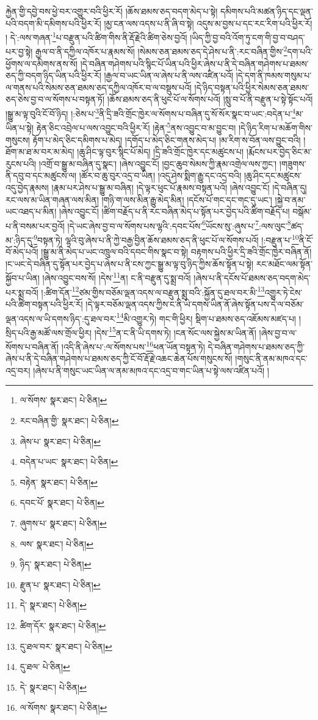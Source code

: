 རྐྱེན་གྱི་དབྱེ་བས་ཕྱེ་བར་འགྱུར་བའི་ཕྱིར་རོ། །ཆོས་ཐམས་ཅད་བདག་མེད་པ་སྟེ། དམིགས་པའི་མཚན་ཉིད་དང་ལྡན་པའི་བདག་མི་དམིགས་པའི་ཕྱིར་རོ། །མྱ་ངན་ལས་འདས་པ་ནི་ཞི་བ་སྟེ། འདུས་མ་བྱས་པ་དང་རང་རིག་པའི་ཕྱིར་རོ། །
དེ་:ལས་གཞན་\footnote{ལ་སོགས་  སྣར་ཐང་།  པེ་ཅིན། }པ་བརྫུན་པའི་ཚིག་གིས་ནི་རྡོ་རྗེའི་ཚིག་ཅེས་བྱའོ། །ཡིད་ཀྱི་བྱ་བའི་འོག་ཏུ་ངག་གི་བྱ་བ་བཤད་པར་བྱ་སྟེ། རྒྱལ་བ་ནི་དཀྱིལ་འཁོར་པ་རྣམས་སོ། །སེམས་ཅན་ཐམས་ཅད་དེ་ཤེས་པ་ནི་:རང་བཞིན་གྱིས་\footnote{རང་བཞིན་གྱི་  སྣར་ཐང་།  པེ་ཅིན། }དག་པའི་ཕྱོགས་ལ་དམིགས་ནས་སོ། །དེ་བཞིན་གཤེགས་པའི་སྙིང་པོ་ཡིན་པའི་ཕྱིར་ཞེས་པ་ནི་དེ་བཞིན་གཤེགས་པ་ཐམས་ཅད་ཀྱི་བདག་ཉིད་ཡིན་པའི་ཕྱིར་རོ། །རྒྱལ་བ་ཡང་ཡིན་ལ་ཞེས་པ་ནི་ལས་འཛིན་པའོ། །དེ་དག་ནི་ཁམས་གསུམ་པ་ལ་གནས་པའི་སེམས་ཅན་ཐམས་ཅད་དཀྱིལ་འཁོར་བ་ལ་བསྡུས་པའོ། །དེ་ཉིད་བསྟན་པའི་ཕྱིར་སེམས་ཅན་ཐམས་ཅད་ཅེས་བྱ་བ་ལ་སོགས་པ་བསྟན་ཏོ། །ཆོས་ཐམས་ཅད་ནི་ཕུང་པོ་ལ་སོགས་པའོ། །སླུ་བ་པོ་ནི་བརྫུན་པ་སྟེ་སྟོང་པའོ། །སྒྱུ་མ་ལྟ་བུའི་ངོ་བོ་ཉིད། །:ཅེས་པ་\footnote{ཞེས་པ་  སྣར་ཐང་།  པེ་ཅིན། }ནི་དྲི་ཟའི་གྲོང་ཁྱེར་ལ་སོགས་པ་བཞིན་དུ་སོ་སོར་སྣང་བ་ཡང་:བདེན་པ་\footnote{བདེན་པ་ཡང་  སྣར་ཐང་།  པེ་ཅིན། }མ་ཡིན་པ་སྟེ། རྟེན་ཅིང་འབྲེལ་པ་ལས་འབྱུང་བའི་ཕྱིར་རོ། །རྟེན་\footnote{བརྟེན་  སྣར་ཐང་།  པེ་ཅིན། }ནས་འབྱུང་བ་མ་བྱུང་བ། །དེ་ཉིད་རིག་པ་མཆོག་གིས་གསུངས། རྟོག་པ་མེད་ཅིང་དམིགས་པ་མེད། །དགོད་པ་མེད་ཅིང་གནས་མེད་པ། །མ་རིག་ས་བོན་ལས་བྱུང་བའི། །ཐོག་མ་ཐ་མ་བར་མ་མེད། །ཆུ་ཤིང་ལྟ་བུར་སྙིང་པོ་མེད། །དྲི་ཟའི་གྲོང་ཁྱེར་དང་མཚུངས་པ། །རྨོངས་པར་བྱེད་ཅིང་མ་རུངས་པའི། །འགྲོ་བ་སྒྱུ་མ་བཞིན་དུ་སྣང་། །ཞེས་འབྱུང་ངོ། །བྱང་ཆུབ་སེམས་ཀྱི་རྣམ་འགྲེལ་ལས་ཀྱང་། །གཟུགས་ནི་དབུ་བ་དང་མཚུངས་ལ། །ཚོར་བ་ཆུ་བུར་འདྲ་བ་ཡིན། །འདུ་ཤེས་སྨིག་རྒྱུ་དང་འདྲ་བའི། །ཆུ་ཤིང་དང་མཚུངས་འདུ་བྱེད་རྣམས། །རྣམ་པར་ཤེས་པ་སྒྱུ་མ་བཞིན། །དེ་ལྟར་ཕུང་པོ་རྣམས་བསྟན་པའོ། །ཞེས་འབྱུང་ངོ། །དེ་བཞིན་དུ། རང་ལས་མ་ཡིན་གཞན་ལས་མིན། །གཉི་ག་ལས་མིན་རྒྱུ་མེད་མིན། །དངོས་པོ་གང་དང་གང་དུ་ཡང་། །སྐྱེ་བ་ནམ་ཡང་འཐད་པ་མིན། །ཞེས་འབྱུང་ངོ། །ཚིག་བརྗོད་པ་ནི་རང་བཞིན་མེད་པ་སྟོན་པར་བྱེད་པའི་ཚིག་བརྗོད་པ། བསྒོམ་པ་ནི་བསམ་པར་བྱའོ། །དེ་ཡང་ཞེས་བྱ་བ་ལ་སོགས་པས་ལྷའི་:དབང་པོས་\footnote{དབང་པོ་  སྣར་ཐང་།  པེ་ཅིན། }ཡོངས་སུ་:ཞུས་པ་\footnote{ཞུགས་པ་  སྣར་ཐང་།  པེ་ཅིན། }:ལས་ལུང་\footnote{ལས་  སྣར་ཐང་།  པེ་ཅིན། }ཚད་མ་:ཉིད་དུ་\footnote{ཉིད་  སྣར་ཐང་།  པེ་ཅིན། }བསྟན་ཏེ། ལྷའི་བུ་ཞེས་པ་ནི་ཀྱེ་བརྒྱ་བྱིན་ཆོས་ཐམས་ཅད་ནི་ཕུང་པོ་ལ་སོགས་པའོ། །:བརྫུན་པ་\footnote{རྫུན་པ་  སྣར་ཐང་།  པེ་ཅིན། }ནི་ངོ་བོ་མེད་པའོ། །སྒྱུ་མ་ནི་མེད་པ་ཡང་འཁྲུལ་བའི་དབང་གིས་སྣང་བ་སྟེ། བརྟགས་པའི་ཕྱིར་དྲི་ཟའི་གྲོང་ཁྱེར་བཞིན་ནོ། །ང་ཡང་དེ་བཞིན་དུ་སྟོན་པར་བྱེད་པ་ཞེས་པ་ནི་ངས་ཀྱང་སྒྱུ་མ་ལྟ་བུ་ཉིད་ཀྱིས་ཆོས་སྟོན་པ་སྟེ། རང་མཐོང་ལམ་སྟོན་སྐྱོབ་པ་ཡིན། །ཞེས་འབྱུང་བས་སོ། །དེས་\footnote{དེ་  སྣར་ཐང་།  པེ་ཅིན། }ན། ང་ནི་བརྫུན་དུ་སྨྲ་བའོ། །ཞེས་པ་ནི་དངོས་པོ་ཐམས་ཅད་བདག་མེད་པར་སྨྲ་བའོ། །:ཚིག་དོན་\footnote{ཚིག་དོར་  སྣར་ཐང་།  པེ་ཅིན། }ཙམ་གྱིས་བཅོམ་ལྡན་འདས་ལ་བརྫུན་སྨྲ་བའི་:སྐྱོན་དུ་ཐལ་བར་མི་\footnote{དུ་ཐལ་བར་  སྣར་ཐང་།  པེ་ཅིན། }འགྱུར་ཏེ་ངེས་པའི་ཚིག་བསྟན་པའི་ཕྱིར་རོ། །དེ་ལྟར་བཅོམ་ལྡན་འདས་ཀྱིས་ང་ནི་ཡི་དགས་ཡིན་ནོ་ཞེས་སྟོན་པས་དེ་ལ་བཅོམ་ལྡན་འདས་ལ་ཡི་དགས་ཉིད་:དུ་ཐལ་བར་\footnote{དུ་ཐལ་  པེ་ཅིན། }མི་འགྱུར་ཏེ། གང་གི་ཕྱིར། སྡིག་པ་ཐམས་ཅད་འཇོམས་མཛད་པ། །སྲིད་པའི་རྒྱ་མཚོ་ལས་གྲོལ་ཕྱིར། །དེས་\footnote{དེ་  སྣར་ཐང་།  པེ་ཅིན། }ན་ང་ནི་ཡི་དགས་ཏེ། །ངན་སོང་ལས་སྐྱེས་མ་ཡིན་ནོ། །ཞེས་བྱ་བ་ལ་སོགས་པ་བཞིན་ནོ། །འདི་ནི་ཞེས་པ་:ལ་སོགས་པས་\footnote{ལ་སོགས་  སྣར་ཐང་།  པེ་ཅིན། }ཕན་ཡོན་བསྟན་ཏེ། དེ་བཞིན་གཤེགས་པ་ཐམས་ཅད་ཀྱི་ཞེས་པ་ནི་དེ་བཞིན་གཤེགས་པ་ཐམས་ཅད་ཀྱི་ངོ་བོ་རྡོ་རྗེ་འཆང་ཆེན་པོས་གསུངས་སོ། །གསུང་ནི་ནམ་མཁའ་དང་འདྲ་བར། །ཞེས་པ་ནི་གསུང་ཡང་ཡིན་ལ་ནམ་མཁའ་དང་འདྲ་བ་གང་ཡིན་པ་སྟེ་ལས་འཛིན་པའོ། །
